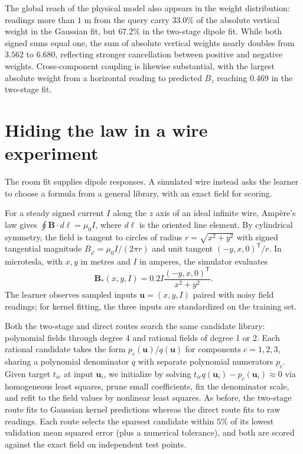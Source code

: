\documentclass[11pt]{article}
\newcommand{\B}{\mathbf B}
\begin{document}
The global reach of the physical model also appears in the weight distribution:
readings more than \(1\) m from the query carry \(33.0\%\) of the absolute
vertical weight in the Gaussian fit, but \(67.2\%\) in the two-stage dipole
fit. While both signed sums equal one, the sum of absolute vertical weights
nearly doubles from \(3.562\) to \(6.680\), reflecting stronger cancellation
between positive and negative weights. Cross-component coupling is likewise
substantial, with the largest absolute weight from a horizontal reading to
predicted \(B_z\) reaching \(0.469\) in the two-stage fit.

\section{Hiding the law in a wire experiment}

The room fit supplies dipole responses. A simulated wire instead asks the
learner to choose a formula from a general library, with an exact field for scoring.

For a steady signed current \(I\) along the \(z\) axis of an ideal infinite
wire, Amp\`ere's law gives \(\oint\B\cdot d\boldsymbol\ell=\mu_0 I\), where
\(d\boldsymbol\ell\) is the oriented line element. By cylindrical symmetry, the
field is tangent to circles of radius \(r=\sqrt{x^2+y^2}\) with signed
tangential magnitude \(B_\varphi=\mu_0 I/(2\pi r)\) and unit tangent
\((-y,x,0)^{\mathsf T}/r\). In microtesla, with \(x,y\) in metres and \(I\) in
amperes, the simulator evaluates
\begin{equation}
 \B_*(x,y,I)=0.2I\frac{(-y,x,0)^{\mathsf T}}{x^2+y^2}.
 \label{eq:wire_truth}
\end{equation}
The learner observes sampled inputs \(\mathbf u=(x,y,I)\) paired with noisy
field readings; for kernel fitting, the three inputs are standardized on the
training set.

Both the two-stage and direct routes search the same candidate library:
polynomial fields through degree 4 and rational fields of degree 1 or 2. Each
rational candidate takes the form \(p_c(\mathbf u)/q(\mathbf u)\) for
components \(c=1,2,3\), sharing a polynomial denominator \(q\) with separate
polynomial numerators \(p_c\). Given target \(t_{ic}\) at input \(\mathbf u_i\),
we initialize by solving \(t_{ic}q(\mathbf u_i)-p_c(\mathbf u_i)\approx0\) via
homogeneous least squares, prune small coefficients, fix the denominator scale,
and refit to the field values by nonlinear least squares. As before, the
two-stage route fits to Gaussian kernel predictions whereas the direct route
fits to raw readings. Each route selects the sparsest candidate within \(5\%\)
of its lowest validation mean squared error (plus a numerical tolerance), and
both are scored against the exact field on independent test points.
\end{document}
